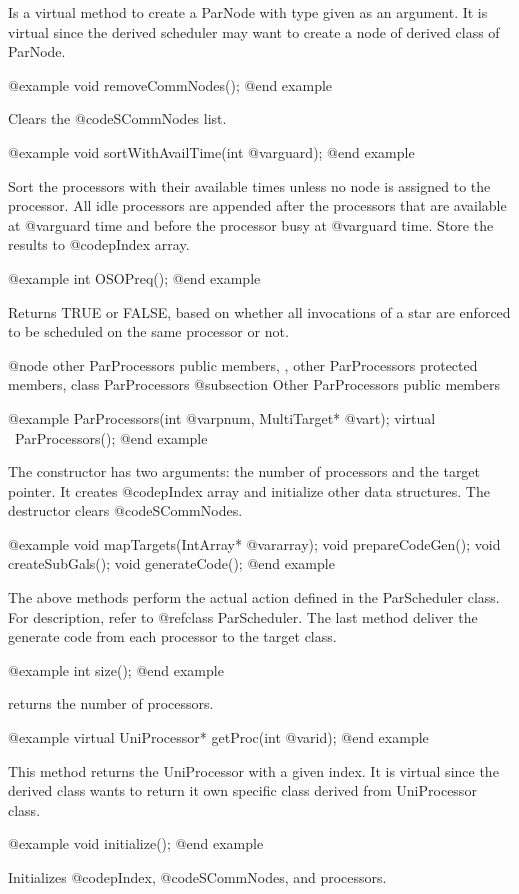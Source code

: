 Is a virtual method to create a ParNode with type given as an argument.
It is virtual since the derived scheduler may want to create a node of 
derived class of ParNode.

@example
void removeCommNodes();
@end example

Clears the @code{SCommNodes} list.

@example
void sortWithAvailTime(int @var{guard});
@end example

Sort the processors with their available times unless no node is assigned to
the processor. All idle processors are appended after the processors
that are available at @var{guard} time and before the processor busy at
@var{guard} time. Store the results to @code{pIndex} array.

@example
int OSOPreq();
@end example

Returns TRUE or FALSE, based on whether all invocations of a star are
enforced to be scheduled on the same processor or not.

@node other ParProcessors public members, , other ParProcessors protected members, class ParProcessors 
@subsection Other ParProcessors public members

@example
ParProcessors(int @var{pnum}, MultiTarget* @var{t});
virtual ~ParProcessors();
@end example

The constructor has two arguments: the number of processors and the target
pointer. It creates @code{pIndex} array and initialize other data structures.
The destructor clears @code{SCommNodes}.

@example
void mapTargets(IntArray* @var{array});
void prepareCodeGen();
void createSubGals();
void generateCode();
@end example

The above methods perform the actual action defined in the ParScheduler class.
For description, refer to @ref{class ParScheduler}. The last method
deliver the generate code from each processor to the target class.

@example
int size();
@end example

returns the number of processors.

@example
virtual UniProcessor* getProc(int @var{id});
@end example

This method returns the UniProcessor with a given index. It is virtual since
the derived class wants to return it own specific class derived from
UniProcessor class.

@example
void initialize();
@end example

Initializes @code{pIndex}, @code{SCommNodes}, and processors.

